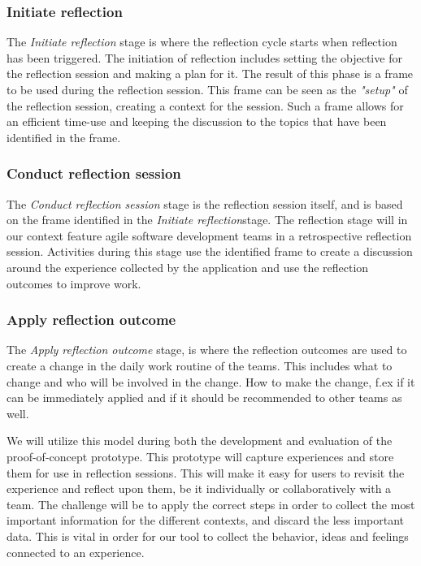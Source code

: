 \subsubsection{Initiate reflection}
The \emph{Initiate reflection} stage is where the reflection cycle starts when reflection has been triggered. The initiation of reflection includes setting the objective for the reflection session and making a plan for it. The result of this phase is a frame to be used during the reflection session. This frame can be seen as the \emph{"setup"} of the reflection session, creating a context for the session. Such a frame allows for an efficient time-use and keeping the discussion to the topics that have been identified in the frame. 

\subsubsection{Conduct reflection session}
The \emph{Conduct reflection session} stage is the reflection session itself, and is based on the frame identified in the \emph{Initiate reflection}stage. The reflection stage will in our context feature agile software development teams in a retrospective reflection session. Activities during this stage use the identified frame to create a discussion around the experience collected by the application and use the reflection outcomes to improve work. 

\subsubsection{Apply reflection outcome}
The \emph{Apply reflection outcome} stage, is where the reflection outcomes are used to create a change in the daily work routine of the teams. This includes what to change and who will be involved in the change. How to make the change, f.ex if it can be immediately applied and if it should be recommended to other teams as well. 

We will utilize this model during both the development and evaluation of the proof-of-concept prototype. This prototype will capture experiences and store them for use in reflection sessions. This will make it easy for users to revisit the experience and reflect upon them, be it individually or collaboratively with a team. The challenge will be to apply the correct steps in order to collect the most important information for the different contexts, and discard the less important data. This is vital in order for our tool to collect the behavior, ideas and feelings connected to an experience.

